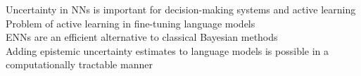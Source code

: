 \documentclass[preview]{standalone}
\begin{document}
Uncertainty in NNs is important for decision-making systems and active learning\\Problem of active learning in fine-tuning language models\\ENNs are an efficient alternative to classical Bayesian methods\\Adding epistemic uncertainty estimates to language models is possible in a computationally tractable manner\\
\end{document}
